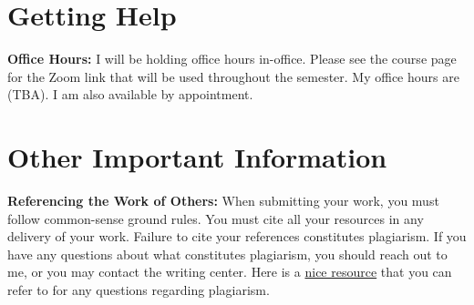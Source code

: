 \documentclass[11pt,letter]{article}
\begin{document}
\section*{Getting Help}

\textbf{Office Hours:} I will be holding office hours in-office. Please see the course page for the Zoom link that will be used throughout the semester.  My office hours are (TBA). I am also available by appointment.

\iffalse
\section*{Quantitative Reasoning Center}
Dickinson College provides additional support for students taking courses with quantitative content across the curriculum through the Quantitative Reasoning (QR) Center. For the Spring 2023 semester, the QR Center will offer tutoring for our course, in addition to general quantitative support. You are strongly encouraged to make an appointment with them. \href{https://www.dickinson.edu/info/20525/quantitative_reasoning_center/2962/quantitative_reasoning_center}{Click here} to access the QR Center webpage.

Please visit \href{https://dickinson.mywconline.com}{dickinson.mywconline.com} to make an appointment. Then, access the drop-down menu under ``limit to" at the top of the scheduler and select DATA 400. This will restrict the tutor list and schedule to only those tutors approved for this course. When you make your appointment, please also paste or upload your assignment and any work that you have done.
\fi

\section*{Other Important Information}

\textbf{Referencing the Work of Others:}  When submitting your work, you must follow common-sense ground rules. You must cite all your resources in any delivery of your work. Failure to cite your references constitutes plagiarism. If you have any questions about what constitutes plagiarism, you should reach out to me, or you may contact the writing center. Here is a \href{https://www.dickinson.edu/download/downloads/id/9568/academic_integrity_quick_tips.pdf}{nice resource} that you can refer to for any questions regarding plagiarism.
\end{document}

